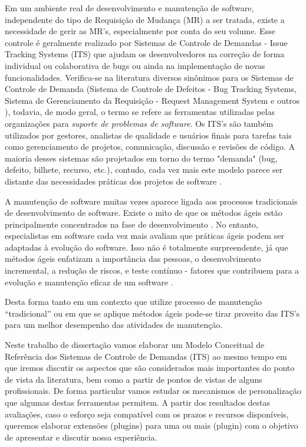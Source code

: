 \documentclass[msc,proposal,hidelot,hideabstract]{ppgccufmg} %
\begin{document}
Em um ambiente real de desenvolvimento e manutenção de software, independente do tipo
de Requisição de Mudança (MR) a ser tratada, existe a necessidade de
gerir as MR's, especialmente por conta do seu volume. Esse controle é geralmente realizado
por Sistemas de Controle de Demandas - Issue Tracking Systems (ITS) que ajudam
os desenvolvedores na correção de forma individual ou colaborativa de bugs ou
ainda na implementação de novas funcionalidades. Verifica-se na literatura diversos
sinônimos para os Sistemas de Controle de Demanda (Sistema de Controle de
Defeitos - Bug Tracking Systems, Sistema de Gerenciamento da Requisição -
Request Management System e outros ), todavia, de modo geral, o
termo se refere as ferramentas utilizadas pelas organizações para \textit{suporte de problemas de software}. Os ITS's são também utilizados por gestores, analistas de qualidade e usuários finais para
tarefas tais como gerenciamento de projetos, comunicação, discussão e revisões
de código. A maioria desses sistemas são projetados em torno do termo "demanda"
(bug, defeito, bilhete, recurso, etc.), contudo, cada vez mais este modelo parece
ser distante das necessidades práticas dos projetos de software
\cite{Baysal:2013:SAP:2486788.2486957}.

A manutenção de software muitas vezes aparece ligada aos processos tradicionais
de desenvolvimento de software. Existe o mito de que os métodos ágeis estão
principalmente concentrados na fase de desenvolvimento
\cite{kajko2009model}. No entanto, especialistas em software cada vez mais
avaliam que práticas ágeis podem ser adaptadas à evolução do software. Isso não
é totalmente surpreendente, já que métodos ágeis enfatizam a importância das
pessoas, o desenvolvimento incremental, a redução de riscos, e teste contínuo -
fatores que contribuem para a evolução e manutenção  eficaz de um software
\cite{thomas2006agile}.

Desta forma tanto em um contexto que utilize processo de manutenção
``tradicional'' ou em que se aplique métodos ágeis pode-se tirar proveito das
ITS's para um melhor desempenho das atividades de manutenção.

Neste trabalho de dissertação vamos elaborar um Modelo Conceitual de Referência
dos Sistemas de Controle de Demandas (ITS) ao mesmo tempo em que iremos discutir os aspectos que
são considerados mais importantes do ponto de vista da literatura, bem como a partir de pontos de vistas de alguns
profissionais. De forma particular vamos estudar os mecanismos de
personalização que algumas destas ferramentas permitem. A partir dos resultados destas avaliações, caso o esforço seja
compatível com os prazos e recursos disponíveis, queremos elaborar extensões (plugins)
para uma ou mais (plugin) com o objetivo de apresentar e
discutir nossa experiência.
\end{document}

